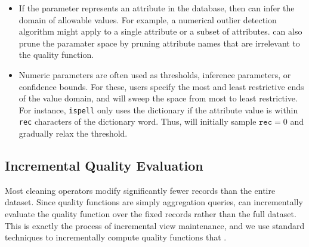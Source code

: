 \begin{itemize}[leftmargin=*,topsep=.3em,itemsep=-.2em,partopsep=-.5em]
  \item {} If the parameter represents an attribute in the database, then \sys can infer the domain of allowable values.   For example, a numerical outlier detection algorithm might apply to a single attribute or a subset of attributes. \sys can also prune the paramater space by pruning attribute names that are irrelevant to the quality function.  

  \item {} Numeric parameters are often used as thresholds, inference parameters, or confidence bounds.  For these, users specify the most and least restrictive ends of the value domain, and \sys will sweep the space from most to least restrictive.   For instance, \texttt{ispell} only uses the dictionary if the attribute value is within \texttt{rec} characters of the dictionary word.  Thus, \sys will initially sample $\texttt{rec}=0$ and gradually relax the threshold.   
\end{itemize}



\subsection{Incremental Quality Evaluation}\label{s:qualityivm}

Most cleaning operators modify significantly fewer records than the entire dataset.  Since quality functions are simply aggregation queries, \sys can incrementally evaluate the quality function over the fixed records rather than the full dataset.  
This is exactly the process of incremental view maintenance, and we use standard techniques to incrementally compute quality functions that .  

